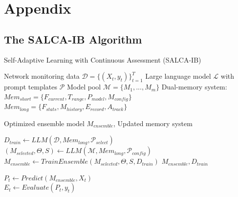 \documentclass[conference]{IEEEtran}
\begin{document}
\section{Appendix}

\subsection{The SALCA-IB Algorithm}
\begin{algorithm}[H]
    \caption{Self-Adaptive Learning with Continuous Assessment (SALCA-IB)}
    \label{alg:salca-ib}
    \begin{algorithmic}[1]
    \Require
        \Statex \hspace{-1em}Network monitoring data $\mathcal{D} = \{(X_t, y_t)\}_{t=1}^T$
        \Statex \hspace{-1em}Large language model $\mathcal{L}$ with prompt templates $\mathcal{P}$
        \Statex \hspace{-1em}Model pool $\mathcal{M} = \{M_1, ..., M_m\}$
        \Statex \hspace{-1em}Dual-memory system: $Mem_{short} = \{F_{current}, T_{range}, P_{model}, M_{config}\}$
        \Statex \hspace{-1em}\hspace{3.6em}$Mem_{long} = \{F_{stats}, M_{history}, E_{record}, A_{track}\}$
    
    \Ensure Optimized ensemble model $M_{ensemble}$, Updated memory system
    
    \vspace{0.5em}
        \State $D_{train} \gets LLM(\mathcal{D}, Mem_{long}, \mathcal{P}_{select})$  \\
        \State $(M_{selected}, \Theta, S) \gets LLM(\mathcal{M}, Mem_{long}, \mathcal{P}_{config})$  \\
        \State $M_{ensemble} \gets TrainEnsemble(M_{selected}, \Theta, S, D_{train})$
        \State \Return $M_{ensemble}, D_{train}$
    \EndFunction
    
            \State $P_t \gets Predict(M_{ensemble}, X_t)$  \\
            \State $E_t \gets Evaluate(P_t, y_t)$  \\
            

\end{algorithmic}
\end{algorithm}
\end{document}
